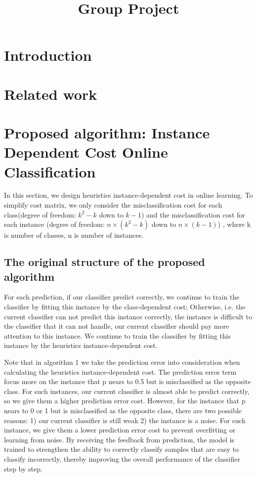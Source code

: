 \documentclass{article}
\title{Group Project}
\author{}
\begin{document}
\maketitle

\begin{abstract}

\end{abstract}

\section{Introduction}

\section{Related work}

\section{Proposed algorithm: Instance Dependent Cost Online Classification}

In this section, we design heuristics instance-dependent cost in online learning. To simplify cost matrix, we only consider the misclassification cost for each class(degree of freedom: $k^2-k$ down to $k-1$) and the misclassification cost for each instance (degree of freedom: $n\times(k^2-k)$ down to $n\times(k-1)$) , where k is number of classes, n is number of instances. 
\subsection{The original structure of the proposed algorithm}

For each prediction, if our classifier predict correctly, we continue to train the classifier by fitting this instance by the class-dependent cost; Otherwise, i.e. the current classifier can not predict this instance correctly, the instance is difficult to the classifier that it can not handle, our current classifier should pay more attention to this instance. We continue to train the classifier by fitting this instance by the heuristics instance-dependent cost.

Note that in algorithm 1 we take the prediction error into consideration when calculating the heuristics instance-dependent cost. The prediction error term focus more on the instance that p nears to 0.5 but is misclassified as the opposite class. For such instances, our current classifier is almost able to predict correctly, so we give them a higher prediction error cost. However, for the instance that p nears to 0 or 1 but is misclassified as the opposite class, there are two possible reasons: 1) our current classifier is still weak 2) the instance is a noise. For such instance, we give them a lower prediction error cost to prevent overfitting or learning from noise. By receiving the feedback from prediction, the model is trained to strengthen the ability to correctly classify samples that are easy to classify incorrectly, thereby improving the overall performance of the classifier step by step.
\end{document}

